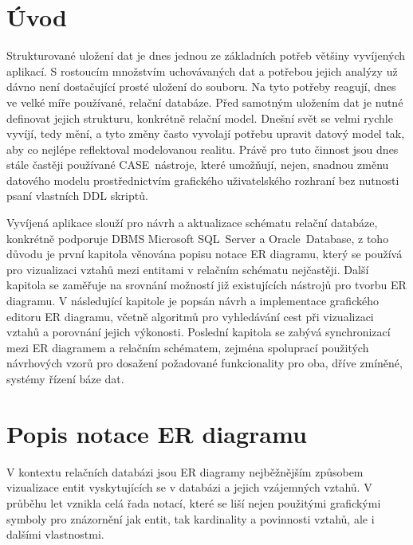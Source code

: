 \documentclass[czech,bachelor,public,dept460,male,oneside]{diploma}
\begin{document}
\MakeTitlePages

\lstlistoflistings

\section{Úvod}
Strukturované uložení dat je dnes jednou ze základních potřeb většiny vyvíjených aplikací. S rostoucím množstvím uchovávaných dat a potřebou jejich analýzy už dávno není dostačující prosté uložení do souboru. Na tyto potřeby reagují, dnes ve velké míře používané, relační databáze. Před samotným uložením dat je nutné definovat jejich strukturu, konkrétně relační model. Dnešní svět se velmi rychle vyvíjí, tedy mění, a tyto změny často vyvolají potřebu upravit datový model tak, aby co nejlépe reflektoval modelovanou realitu. Právě pro tuto činnost jsou dnes stále častěji používané CASE~nástroje, které umožňují, nejen, snadnou změnu datového modelu prostřednictvím grafického uživatelského rozhraní bez nutnosti psaní vlastních DDL skriptů.

Vyvíjená aplikace slouží pro návrh a aktualizace schématu relační databáze, konkrétně podporuje DBMS Microsoft SQL~Server a Oracle~Database, z toho důvodu je první kapitola věnována popisu notace ER diagramu, který se používá pro vizualizaci vztahů mezi entitami v relačním schématu nejčastěji. Další kapitola se zaměřuje na srovnání možností již existujících nástrojů pro tvorbu ER diagramu. V následující kapitole je popsán návrh a implementace grafického editoru ER diagramu, včetně algoritmů pro vyhledávání cest při vizualizaci vztahů a porovnání jejich výkonosti. Poslední kapitola se zabývá synchronizací mezi ER diagramem a relačním schématem, zejména spoluprací použitých návrhových vzorů pro dosažení požadované funkcionality pro oba, dříve zmíněné, systémy řízení báze dat.

\section{Popis notace ER diagramu}
V kontextu relačních databázi jsou ER diagramy nejběžnějším způsobem vizualizace entit vyskytujících se v databázi a jejich vzájemných vztahů. V průběhu let vznikla celá řada notací, které se liší nejen použitými grafickými symboly pro znázornění jak entit, tak kardinality a povinnosti vztahů, ale i dalšími vlastnostmi.
\end{document}
